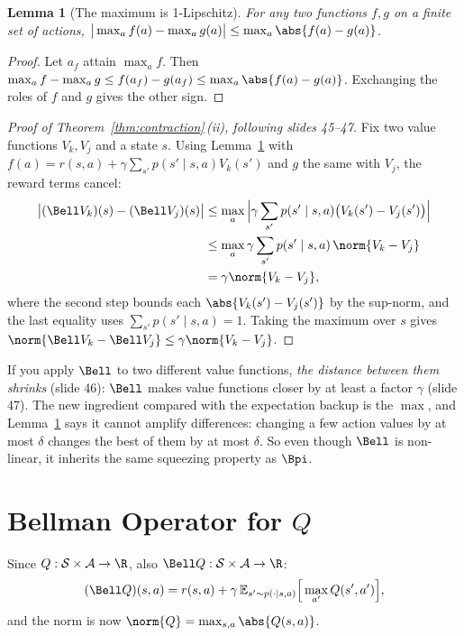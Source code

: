 \documentclass[11pt,a4paper]{article}
\newcommand{\E}{\mathbb{E}}
\newcommand{\cS}{\mathcal{S}}
\newcommand{\cA}{\mathcal{A}}
\theoremstyle{plain}
\newtheorem{lemma}[theorem]{Lemma}
\theoremstyle{definition}
\theoremstyle{remark}
\begin{document}
\begin{lemma}[The maximum is 1-Lipschitz]\label{lem:max}
For any two functions $f,g$ on a finite set of actions, $\big|\max_af(a)-\max_ag(a)\big|\le\max_a\abs{f(a)-g(a)}$.
\end{lemma}
\begin{proof}
Let $a_f$ attain $\max_af$. Then $\max_af-\max_ag\le f(a_f)-g(a_f)\le\max_a\abs{f(a)-g(a)}$. Exchanging the roles of $f$ and $g$ gives the other sign.
\end{proof}

\begin{proof}[Proof of Theorem~\ref{thm:contraction}\,(ii), following slides 45--47]
Fix two value functions $V_k,V_j$ and a state $s$. Using Lemma~\ref{lem:max} with $f(a)=r(s,a)+\gamma\sum_{s'}p(s'\mid s,a)V_k(s')$ and $g$ the same with $V_j$, the reward terms cancel:
\begin{align*}
\big|(\Bell V_k)(s)-(\Bell V_j)(s)\big|
&\le\max_a\Big|\gamma\sum_{s'}p(s'\mid s,a)\big(V_k(s')-V_j(s')\big)\Big|\\
&\le\max_a\gamma\sum_{s'}p(s'\mid s,a)\,\norm{V_k-V_j}\\
&=\gamma\norm{V_k-V_j},
\end{align*}
where the second step bounds each $\abs{V_k(s')-V_j(s')}$ by the sup-norm, and the last equality uses $\sum_{s'}p(s'\mid s,a)=1$. Taking the maximum over $s$ gives $\norm{\Bell V_k-\Bell V_j}\le\gamma\norm{V_k-V_j}$.
\end{proof}

\begin{intuition}
If you apply $\Bell$ to two different value functions, \emph{the distance between them shrinks} (slide 46): $\Bell$ makes value functions closer by at least a factor $\gamma$ (slide 47). The new ingredient compared with the expectation backup is the $\max$, and Lemma~\ref{lem:max} says it cannot amplify differences: changing a few action values by at most $\delta$ changes the best of them by at most $\delta$. So even though $\Bell$ is non-linear, it inherits the same squeezing property as $\Bpi$.
\end{intuition}

\section{Bellman Operator for $Q$ }
Since $Q:\cS\times\cA\to\R$, also $\Bell Q:\cS\times\cA\to\R$:
\[
(\Bell Q)(s,a)=r(s,a)+\gamma\,\E_{s'\sim p(\cdot\mid s,a)}\Big[\max_{a'}Q(s',a')\Big],
\]
and the norm is now $\norm{Q}=\max_{s,a}\abs{Q(s,a)}$.
\end{document}
